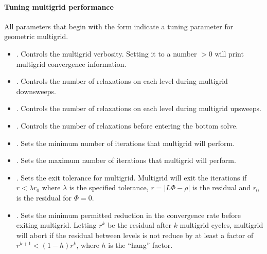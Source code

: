 \documentclass[letterpaper,10pt,english]{sphinxmanual}
\begin{document}
\paragraph{Tuning multigrid performance}
\label{\detokenize{Solvers/RTE:tuning-multigrid-performance}}
\sphinxAtStartPar
All parameters that begin with the form  indicate a tuning parameter for geometric multigrid.
\begin{itemize}
\item {} 
\sphinxAtStartPar
{}.
Controls the multigrid verbosity.
Setting it to a number \(> 0\) will print multigrid convergence information.

\item {} 
\sphinxAtStartPar
{}.
Controls the number of relaxations on each level during multigrid downsweeps.

\item {} 
\sphinxAtStartPar
{}.
Controls the number of relaxations on each level during multigrid upsweeps.

\item {} 
\sphinxAtStartPar
{}.
Controls the number of relaxations before entering the bottom solve.

\item {} 
\sphinxAtStartPar
{}.
Sets the minimum number of iterations that multigrid will perform.

\item {} 
\sphinxAtStartPar
{}.
Sets the maximum number of iterations that multigrid will perform.

\item {} 
\sphinxAtStartPar
{}.
Sets the exit tolerance for multigrid.
Multigrid will exit the iterations if \(r < \lambda r_0\) where \(\lambda\) is the specified tolerance, \(r = |L\Phi -\rho|\) is the residual and \(r_0\) is the residual for \(\Phi = 0\).

\item {} 
\sphinxAtStartPar
{}.
Sets the minimum permitted reduction in the convergence rate before exiting multigrid.
Letting \(r^k\) be the residual after \(k\) multigrid cycles, multigrid will abort if the residual between levels is not reduce by at least a factor of \(r^{k+1} < (1-h)r^k\), where \(h\) is the “hang” factor.


\end{itemize}
\end{document}
